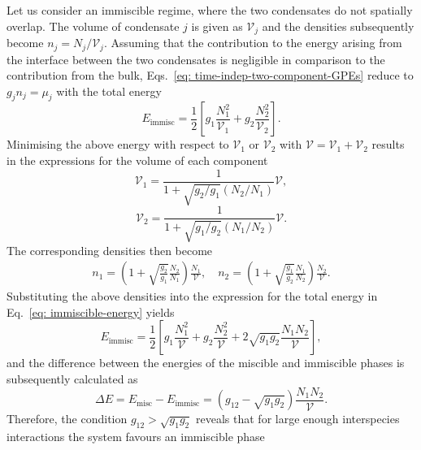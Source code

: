 Let us consider an immiscible regime, where the two condensates do not spatially
overlap.
The volume of condensate \(j\) is given as \(\mathcal{V}_j\) and the densities
subsequently become \(n_j=N_j/\mathcal{V}_j\).
Assuming that the contribution to the energy arising from the interface between
the two condensates is negligible in comparison to the contribution from the
bulk, Eqs.~\eqref{eq: time-indep-two-component-GPEs} reduce to
\(g_j n_j = \mu_j\) with the total energy
\begin{equation}\label{eq: immiscible-energy}
    E_\mathrm{immisc} = \frac{1}{2}\left[g_1\frac{N_1^2}{\mathcal{V}_1}
        + g_2\frac{N_2^2}{\mathcal{V}_2}\right].
\end{equation}
Minimising the above energy with respect to \(\mathcal{V}_1\) or
\(\mathcal{V}_2\) with \(\mathcal{V}=\mathcal{V}_1+\mathcal{V}_2\) results in
the expressions for the volume of each component
\begin{equation}
    \mathcal{V}_1 = \frac{1}{1 + \sqrt{g_2/g_1}(N_2/N_1)}\mathcal{V},
\end{equation}
\begin{equation}
    \mathcal{V}_2 = \frac{1}{1 + \sqrt{g_1/g_2}(N_1/N_2)}\mathcal{V}.
\end{equation}
The corresponding densities then become
\begin{equation}
    \begin{aligned}
        n_1 = \left(1 + \sqrt{\frac{g_2}{g_1}}\frac{N_2}{N_1}\right)
        \frac{N_1}{\mathcal{V}}, \quad
        n_2 = \left(1 + \sqrt{\frac{g_1}{g_2}}\frac{N_1}{N_2}\right)
        \frac{N_2}{\mathcal{V}}.
    \end{aligned}
\end{equation}
Substituting the above densities into the expression for the total energy
in Eq.~\eqref{eq: immiscible-energy} yields
\begin{equation}
    E_\mathrm{immisc} = \frac{1}{2}\left[g_1\frac{N_1^2}{\mathcal{V}}
    + g_2\frac{N_2^2}{\mathcal{V}}
    + 2\sqrt{g_1g_2}\frac{N_1N_2}{\mathcal{V}}\right],
\end{equation}
and the difference between the energies of the miscible and immiscible phases is
subsequently calculated as
\begin{equation}
    \Delta E = E_\mathrm{misc} - E_\mathrm{immisc} = (g_{12} - \sqrt{g_1g_2})
    \frac{N_1N_2}{\mathcal{V}}.
\end{equation}
Therefore, the condition \(g_{12} > \sqrt{g_1g_2}\) reveals that for large
enough interspecies interactions the system favours an immiscible phase

